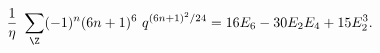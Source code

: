 \begin{equation}
    {1\over\eta}~ \sum_\Z (-1)^n (6n+1)^6 ~q^{(6n+1)^2 /24} 
    = 16 E_6 - 30 E_2 E_4 + 15 E_2^3 .
\end{equation}


